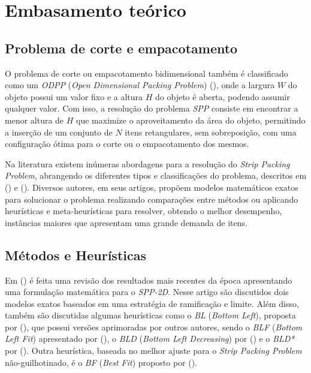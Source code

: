\section{Embasamento teórico}

    \subsection{Problema de corte e empacotamento}
        
        O problema de corte ou empacotamento bidimensional também é classificado como um \emph{ODPP} (\emph{Open Dimensional Packing Problem}) (\cite{Wascher2007}), onde a largura $W$ do objeto possui um valor fixo e a altura $H$ do objeto é aberta, podendo assumir qualquer valor. Com isso, a resolução do problema \emph{SPP} consiste em encontrar a menor altura de $H$ que maximize o aproveitamento da área do objeto, permitindo a inserção de um conjunto de $N$ itens retangulares, sem sobreposição, com uma configuração ótima para o corte ou o empacotamento dos mesmos.

        Na literatura existem inúmeras abordagens para a resolução do \emph{Strip Packing Problem}, abrangendo os diferentes tipos e classificações do problema, descritos em (\cite{hopper2000two}) e (\cite{Wascher2007}). Diversos autores, em seus artigos, propõem modelos matemáticos exatos para solucionar o problema realizando comparações entre métodos ou aplicando heurísticas e meta-heurísticas para resolver, obtendo o melhor desempenho, instâncias maiores que apresentam uma grande demanda de itens.

        
    \subsection{Métodos e Heurísticas}

        \begin{comment}
            REVISAR OU TIRAR SEÇÃO DE HEURÍSTICAS.
        \end{comment}
    
        Em (\cite{Riff2009}) é feita uma revisão dos resultados mais recentes da época apresentando uma formulação matemática para o \emph{SPP-2D}. Nesse artigo são discutidos dois modelos exatos baseados em uma estratégia de ramificação e limite. Além disso, também são discutidas algumas heurísticas como o \emph{BL} (\emph{Bottom Left}), proposta por (\cite{Baker1980}), que possui versões aprimoradas por outros autores, sendo o \emph{BLF} (\emph{Bottom Left Fit}) apresentado por (\cite{Chazelle1983}), o \emph{BLD} (\emph{Bottom Left Decreasing}) por (\cite{HOPPER200134}) e o \emph{BLD*} por (\cite{Lesh2005}). Outra heurística, baseada no melhor ajuste para o \emph{Strip Packing Problem} não-guilhotinado, é o \emph{BF} (\emph{Best Fit}) proposto por (\cite{Burke2004}).

